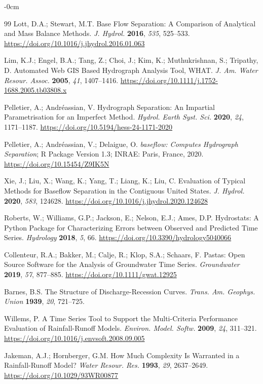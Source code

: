 \documentclass[hydrology,article,submit,pdftex,moreauthors]{Definitions/mdpi}
\begin{document}
\begin{adjustwidth}{-\extralength}{0cm}
\begin{thebibliography}{99}
Lott, D.A.; Stewart, M.T. Base Flow Separation: A Comparison of Analytical and Mass Balance Methods. \textit{J. Hydrol.} \textbf{2016}, \textit{535}, 525--533. \url{https://doi.org/10.1016/j.jhydrol.2016.01.063}

Lim, K.J.; Engel, B.A.; Tang, Z.; Choi, J.; Kim, K.; Muthukrishnan, S.; Tripathy, D. Automated Web GIS Based Hydrograph Analysis Tool, WHAT. \textit{J. Am. Water Resour. Assoc.} \textbf{2005}, \textit{41}, 1407--1416. \url{https://doi.org/10.1111/j.1752-1688.2005.tb03808.x}

Pelletier, A.; Andr\'{e}assian, V. Hydrograph Separation: An Impartial Parametrisation for an Imperfect Method. \textit{Hydrol. Earth Syst. Sci.} \textbf{2020}, \textit{24}, 1171--1187. \url{https://doi.org/10.5194/hess-24-1171-2020}

Pelletier, A.; Andr\'{e}assian, V.; Delaigue, O. \textit{baseflow: Computes Hydrograph Separation}; R Package Version 1.3; INRAE: Paris, France, 2020. \url{https://doi.org/10.15454/Z9IK5N}

Xie, J.; Liu, X.; Wang, K.; Yang, T.; Liang, K.; Liu, C. Evaluation of Typical Methods for Baseflow Separation in the Contiguous United States. \textit{J. Hydrol.} \textbf{2020}, \textit{583}, 124628. \url{https://doi.org/10.1016/j.jhydrol.2020.124628}

Roberts, W.; Williams, G.P.; Jackson, E.; Nelson, E.J.; Ames, D.P. Hydrostats: A Python Package for Characterizing Errors between Observed and Predicted Time Series. \textit{Hydrology} \textbf{2018}, \textit{5}, 66. \url{https://doi.org/10.3390/hydrology5040066}

Collenteur, R.A.; Bakker, M.; Calje, R.; Klop, S.A.; Schaars, F. Pastas: Open Source Software for the Analysis of Groundwater Time Series. \textit{Groundwater} \textbf{2019}, \textit{57}, 877--885. \url{https://doi.org/10.1111/gwat.12925}

Barnes, B.S. The Structure of Discharge-Recession Curves. \textit{Trans. Am. Geophys. Union} \textbf{1939}, \textit{20}, 721--725.

Willems, P. A Time Series Tool to Support the Multi-Criteria Performance Evaluation of Rainfall-Runoff Models. \textit{Environ. Model. Softw.} \textbf{2009}, \textit{24}, 311--321. \url{https://doi.org/10.1016/j.envsoft.2008.09.005}

Jakeman, A.J.; Hornberger, G.M. How Much Complexity Is Warranted in a Rainfall-Runoff Model? \textit{Water Resour. Res.} \textbf{1993}, \textit{29}, 2637--2649. \url{https://doi.org/10.1029/93WR00877}


\end{thebibliography}
\end{adjustwidth}
\end{document}
